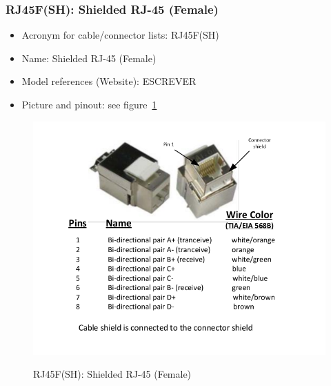 \subsubsection{RJ45F(SH): Shielded RJ-45 (Female)} \label{DEVICE:RJ45F(SH)}
\begin{itemize}
  \item Acronym for cable/connector lists: RJ45F(SH)
  \item Name: Shielded RJ-45 (Female)
  \item Model references (Website): ESCREVER
  \item Picture and pinout: see figure~\ref{FIG:DEVICERJ45F(SH)}
\end{itemize}
\begin{figure}
  \centering
  \includegraphics[angle=90,width=1\columnwidth]{figs/body02/FIGDEVICERJ45F(SH).pdf}\\
  \caption[RJ45F(SH): Shielded RJ-45 (Female)]{RJ45F(SH): Shielded RJ-45 (Female)}
  \label{FIG:DEVICERJ45F(SH)}
\end{figure}
